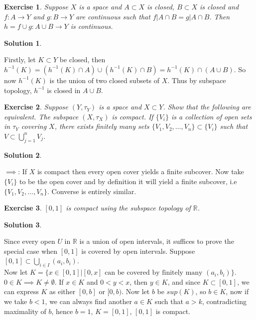 \documentclass[11pt,a4paper]{article}
\newtheorem{Ex}{Exercise}
\newtheorem{Sol}{Solution}
\begin{document}
\begin{Ex}
	Suppose $X$ is a space and $A \subset X$ is closed, $B \subset X$ is closed and $f: A \rightarrow Y$ and $g: B \rightarrow Y$ are continuous such that $f|A \cap B = g|A\cap B$. Then $h = f \cup g: A\cup B \rightarrow Y$ is continuous.
\end{Ex}

\begin{Sol} \end{Sol}
\noindent Firstly, let $K \subset Y$ be closed, then $h^{-1}(K) = (h^{-1}(K) \cap A) \cup (h^{-1}(K) \cap B) = h^{-1}(K) \cap (A \cup B)$. So now $h^{-1}(K)$ is the union of two closed subsets of $X$. Thus by subspace topology, $h^{-1}$ is closed in $A \cup B$.

\begin{Ex}
	Suppose $(Y, \tau_Y)$ is a space and $X \subset Y$. Show that the following are equivalent. The subspace $(X, \tau_X)$ is compact. If $\{V_i\}$ is a collection of open sets in $\tau_Y$ covering  $X$, there exists finitely many sets $\{V_1, V_2, \dots ,V_n\} \subset \{V_i\}$ such that $V \subset \bigcup_{j=1}^n V_j$.

\end{Ex}

\begin{Sol} \end{Sol}
\noindent $\implies$: If $X$ is compact then every open cover yields a finite subcover. Now take $\{V_i\}$ to be the open cover and by definition it will yield a finite subcover, i.e $\{V_1, V_2, \dots ,V_n \}$. Converse is entirely similar. 

\begin{Ex}
	$[0,1]$ is compact using the subspace topology of $\mathbb{R}$.
\end{Ex}

\begin{Sol}\end{Sol}

\noindent Since every open $U$ in $\mathbb{R}$ is a union of open intervals, it suffices to prove the special case when $[0,1]$ is covered by open intervals. Suppose $[0,1] \subset \bigcup_{i \in I}(a_i,b_i)$. \\ Now let $K = \{x \in [0,1]| [0,x] \text{ can be covered by finitely many }(a_i, b_i) \}$. $0 \in K \implies K \neq \emptyset$. If $x \in K$ and $0 < y < x$, then $y \in K$, and since $K \subset [0,1]$, we can express $K$ as either $[0,b]$ or $[0,b)$. Now let $b$ be $sup(K)$, so $b \in K$, now if we take $b<1$, we can always find another $a \in K$ such that $a > k$, contradicting maximality of $b$, hence $b = 1$, $K = [0,1]$, $[0,1]$ is compact.
\end{document}
